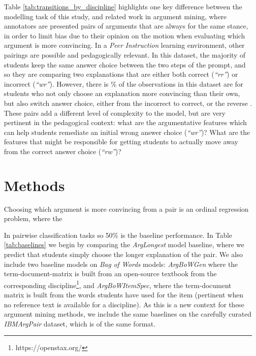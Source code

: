 \documentclass[runningheads]{llncs}
\begin{document}
Table \ref{tab:transitions_by_discipline} highlights one key difference between 
the modelling task of this study, and related work in argument mining, where 
annotators are presented pairs of arguments that are always for the same 
stance, in order to limit bias due to their opinion on the motion when 
evaluating which argument is more convincing.
In a \textit{Peer Instruction} learning environment, other pairings are 
possible and pedagogically relevant. In this dataset, the majority of students 
keep the same answer choice between the two steps of the prompt, and so they 
are comparing two explanations that are either both correct (\textit{``rr''}) 
or incorrect (\textit{``wr''}). However, there is 
\% of the observations in this dataset are for students 
who not only choose an explanation more convincing than their own, but also 
switch answer choice, 
either from the incorrect to correct, or the reverse . These pairs add a 
different level of complexity to the model, but are very pertinent in the 
pedagogical context: what are the argumentative features which can help 
students remediate an initial wrong answer choice (\textit{``wr''})? What are 
the features that might be responsible for getting students to actually move 
away from the correct answer choice (\textit{``rw''})?



\section{Methods}
Choosing which argument is more convincing from a pair is an 
ordinal regression problem, where the 


In pairwise classification tasks so 50\% is the baseline performance.  
In Table \ref{tab:baselines} we begin by comparing the \textit{ArgLongest} 
model baseline, where we predict that students simply choose the longer 
explanation of the pair.
We also include two baseline models on \textit{Bag of Words} models: 
\textit{ArgBoWGen} where the term-document-matrix is built from an open-source 
textbook from the corresponding discipline\footnote{https://openstax.org/}, and 
\textit{ArgBoWItemSpec}, where the term-document matrix is built from the words 
students have used for the item (pertinent when no reference text is available 
for a discipline).
As this is a new context for these argument mining methods, we include the same 
baselines on the carefully curated \textit{IBMArgPair} dataset, which is of the 
same format.
\end{document}
